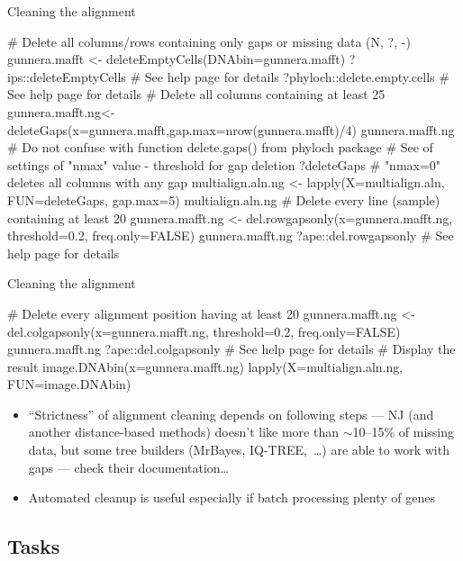 \documentclass[compress, xelatex, 11pt, xcolor=svgnames, aspectratio=169,
	hyperref={
		bookmarks=true,
		unicode=true,
		colorlinks=true,
		pdftitle={Molecular data in R},
		plainpages=false,
		pdfauthor={Vojtech Zeisek},
		pdfsubject={Course about phylogeny and evolution in R},
		pdfcreator={XeLaTeX},
		pdfkeywords={R, evolution, phylogeny, molecular data},
		linkcolor=Crimson, %
		anchorcolor=Magenta, %
		citecolor=Magenta, %
		filecolor=Magenta, %
		menucolor=Magenta, %
		urlcolor=DodgerBlue, %
		},
	url={hyphens, lowtilde} %
	]{beamer}
\begin{document}
\begin{frame}[fragile]{Cleaning the alignment}
	\begin{spluscode}
    # Delete all columns/rows containing only gaps or missing data (N, ?, -)
    gunnera.mafft <- deleteEmptyCells(DNAbin=gunnera.mafft)
    ?ips::deleteEmptyCells # See help page for details
    ?phyloch::delete.empty.cells # See help page for details
    # Delete all columns containing at least 25%
    gunnera.mafft.ng<-deleteGaps(x=gunnera.mafft,gap.max=nrow(gunnera.mafft)/4)
    gunnera.mafft.ng
    # Do not confuse with function delete.gaps() from phyloch package
    # See of settings of "nmax" value - threshold for gap deletion
    ?deleteGaps # "nmax=0" deletes all columns with any gap
    multialign.aln.ng <- lapply(X=multialign.aln, FUN=deleteGaps, gap.max=5)
    multialign.aln.ng
    # Delete every line (sample) containing at least 20%
    gunnera.mafft.ng <- del.rowgapsonly(x=gunnera.mafft.ng, threshold=0.2,
      freq.only=FALSE)
    gunnera.mafft.ng
    ?ape::del.rowgapsonly # See help page for details
	\end{spluscode}
\end{frame}

\begin{frame}[fragile]{Cleaning the alignment}
	\begin{spluscode}
    # Delete every alignment position having at least 20%
    gunnera.mafft.ng <- del.colgapsonly(x=gunnera.mafft.ng, threshold=0.2,
      freq.only=FALSE)
    gunnera.mafft.ng
    ?ape::del.colgapsonly # See help page for details
    # Display the result
    image.DNAbin(x=gunnera.mafft.ng)
    lapply(X=multialign.aln.ng, FUN=image.DNAbin)
	\end{spluscode}
	\vfil
	\begin{itemize}
		\item \enquote{Strictness} of alignment cleaning depends on following steps --- NJ (and another distance-based methods) doesn't like more than $\sim$10--15\% of missing data, but some tree builders (MrBayes, IQ-TREE,~\ldots) are able to work with gaps --- check their documentation\ldots
		\item Automated cleanup is useful especially if batch processing plenty of genes
	\end{itemize}
\end{frame}

\subsection{Tasks}
\end{document}
